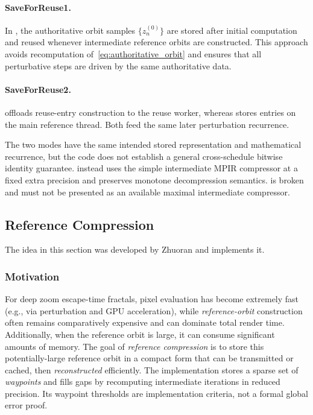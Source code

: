\paragraph{SaveForReuse1.}
In , the authoritative orbit samples $\{z^{(0)}_n\}$ are stored after initial computation and reused
whenever intermediate reference orbits are constructed.
This approach avoids recomputation of~\eqref{eq:authoritative_orbit} and ensures that all perturbative steps are driven by the same
authoritative data.

\paragraph{SaveForReuse2.}
 offloads reuse-entry construction to the reuse worker,
whereas  stores entries on the main reference thread.  Both
feed the same later perturbation recurrence.

The two modes have the same intended stored representation and mathematical
recurrence, but the code does not establish a general cross-schedule bitwise
identity guarantee.   instead uses the simple intermediate
MPIR compressor at a fixed extra precision and preserves monotone decompression
semantics.   is broken and must not be presented as an
available maximal intermediate compressor.

\subsection{Reference Compression}
\label{sec:ref-compression-zhuoran}

The idea in this section was developed by Zhuoran
\cite{Zhuoran2023ReferenceCompression} and \FractalShark{} implements it.

\subsubsection{Motivation}
For deep zoom escape-time fractals, pixel evaluation has become extremely fast
(e.g., via perturbation and GPU acceleration), while \emph{reference-orbit}
construction often remains comparatively expensive and can dominate total render
time.  Additionally, when the reference orbit is large, it can consume
significant amounts of memory.  The goal of \emph{reference compression} is to
store this potentially-large reference orbit in a compact form that can be
transmitted or cached, then \emph{reconstructed} efficiently. The implementation
stores a sparse set of \emph{waypoints} and fills gaps by recomputing
intermediate iterations in reduced precision.  Its waypoint thresholds are
implementation criteria, not a formal global error proof.

